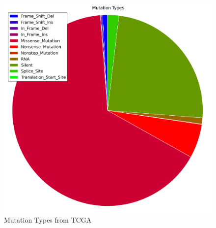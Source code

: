 \begin{figure}[H]
  \caption{Mutation Types from TCGA}
  \includegraphics[width=\textwidth]{./figures/supplementary/domains/mutationTypePieChart.png}
\end{figure}

